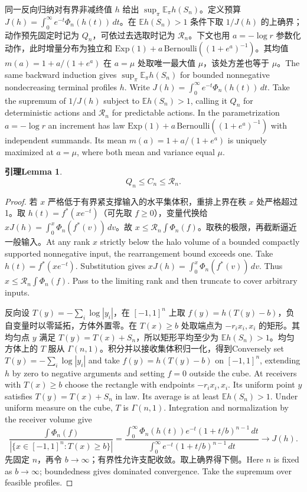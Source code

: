\documentclass[UTF8,fontset=fandol,11pt]{ctexart}
\newcommand{\bi}[2]{\ifdefined\ResearchPaperChinese #1\else #2\fi}
\newtheorem{lem}[thm]{\bi{引理}{Lemma}}
\begin{document}
\bi{同一反向归纳对有界非减终值 $h$ 给出 $\sup_\pi\mathbb E_\pi h(S_n)$。定义预算 $J(h)=\int_0^\infty e^{-t}\Phi_n(h(t))\,dt$。在 $\mathbb Eh(S_n)>1$ 条件下取 $1/J(h)$ 的上确界；动作预先固定时记为 $Q_n$，可依过去选取时记为 $\mathcal R_n$。下文也用 $a=-\log r$ 参数化动作，此时增量分布为独立和 $\mathrm{Exp}(1)+a\,\mathrm{Bernoulli}((1+e^a)^{-1})$。其均值 $m(a)=1+a/(1+e^a)$ 在 $a=\mu$ 处取唯一最大值 $\mu$，该处方差也等于 $\mu$。}{The same backward induction gives $\sup_\pi\mathbb E_\pi h(S_n)$ for bounded nonnegative nondecreasing terminal profiles $h$. Write $J(h)=\int_0^\infty e^{-t}\Phi_n(h(t))\,dt$. Take the supremum of $1/J(h)$ subject to $\mathbb Eh(S_n)>1$, calling it $Q_n$ for deterministic actions and $\mathcal R_n$ for predictable actions. In the parametrization $a=-\log r$ an increment has law $\mathrm{Exp}(1)+a\,\mathrm{Bernoulli}((1+e^a)^{-1})$ with independent summands. Its mean $m(a)=1+a/(1+e^a)$ is uniquely maximized at $a=\mu$, where both mean and variance equal $\mu$.}
\begin{lem}\label{bridge}
\[
 Q_n\le C_n\le\mathcal R_n.
\]
\end{lem}
\begin{proof}
\bi{若 $x$ 严格低于有界紧支撑输入的水平集体积，重排上界在秩 $x$ 处严格超过 1。取 $h(t)=f^*(xe^{-t})$（可先取 $f\ge0$），变量代换给 $xJ(h)=\int_0^x\Phi_n(f^*(v))\,dv$。故 $x\le\mathcal R_n\int\Phi_n(f)$。取秩的极限，再截断逼近一般输入。}{At any rank $x$ strictly below the halo volume of a bounded compactly supported nonnegative input, the rearrangement bound exceeds one. Take $h(t)=f^*(xe^{-t})$. Substitution gives $xJ(h)=\int_0^x\Phi_n(f^*(v))\,dv$. Thus $x\le\mathcal R_n\int\Phi_n(f)$. Pass to the limiting rank and then truncate to cover arbitrary inputs.}

\bi{反向设 $T(y)=-\sum_i\log|y_i|$，在 $[-1,1]^n$ 上取 $f(y)=h(T(y)-b)$，负自变量时以零延拓，方体外置零。在 $T(x)\ge b$ 处取端点为 $-r_i x_i,x_i$ 的矩形。其均匀点 $y$ 满足 $T(y)=T(x)+S_n$，所以矩形平均至少为 $\mathbb Eh(S_n)>1$。均匀方体上的 $T$ 服从 $\Gamma(n,1)$。积分并以接收集体积归一化，得到}{Conversely set $T(y)=-\sum_i\log|y_i|$ and take $f(y)=h(T(y)-b)$ on $[-1,1]^n$, extending $h$ by zero to negative arguments and setting $f=0$ outside the cube. At receivers with $T(x)\ge b$ choose the rectangle with endpoints $-r_ix_i,x_i$. Its uniform point $y$ satisfies $T(y)=T(x)+S_n$ in law. Its average is at least $\mathbb Eh(S_n)>1$. Under uniform measure on the cube, $T$ is $\Gamma(n,1)$. Integration and normalization by the receiver volume give}
\[
 \frac{\int\Phi_n(f)}{|\{x\in[-1,1]^n:T(x)\ge b\}|}
 =\frac{\int_0^\infty \Phi_n(h(t))e^{-t}(1+t/b)^{n-1}\,dt}
 {\int_0^\infty e^{-t}(1+t/b)^{n-1}\,dt}\longrightarrow J(h).
\]
\bi{先固定 $n$，再令 $b\to\infty$；有界性允许支配收敛。取上确界得下侧。}{Here $n$ is fixed as $b\to\infty$; boundedness gives dominated convergence. Take the supremum over feasible profiles.}
\end{proof}
\end{document}
